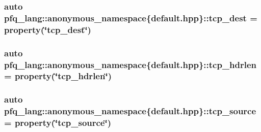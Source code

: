 \hypertarget{namespacepfq__lang_1_1anonymous__namespace_02default_8hpp_03_a3123415d88452c599055bf8eaba2211e}{
\subsubsection[{tcp\+\_\+dest}]{\setlength{\rightskip}{0pt plus 5cm}auto pfq\+\_\+lang\+::anonymous\+\_\+namespace\{default.\+hpp\}\+::tcp\+\_\+dest = {\bf property}(\char`\"{}tcp\+\_\+dest\char`\"{})}}\label{namespacepfq__lang_1_1anonymous__namespace_02default_8hpp_03_a3123415d88452c599055bf8eaba2211e}
\hypertarget{namespacepfq__lang_1_1anonymous__namespace_02default_8hpp_03_aa8e6b2154ad12220fd1f348c37eaa621}{
\subsubsection[{tcp\+\_\+hdrlen}]{\setlength{\rightskip}{0pt plus 5cm}auto pfq\+\_\+lang\+::anonymous\+\_\+namespace\{default.\+hpp\}\+::tcp\+\_\+hdrlen = {\bf property}(\char`\"{}tcp\+\_\+hdrlen\char`\"{})}}\label{namespacepfq__lang_1_1anonymous__namespace_02default_8hpp_03_aa8e6b2154ad12220fd1f348c37eaa621}
\hypertarget{namespacepfq__lang_1_1anonymous__namespace_02default_8hpp_03_a4b3ea94407fb5f52e5dfd9e2511f04a8}{
\subsubsection[{tcp\+\_\+source}]{\setlength{\rightskip}{0pt plus 5cm}auto pfq\+\_\+lang\+::anonymous\+\_\+namespace\{default.\+hpp\}\+::tcp\+\_\+source = {\bf property}(\char`\"{}tcp\+\_\+source\char`\"{})}}\label{namespacepfq__lang_1_1anonymous__namespace_02default_8hpp_03_a4b3ea94407fb5f52e5dfd9e2511f04a8}
